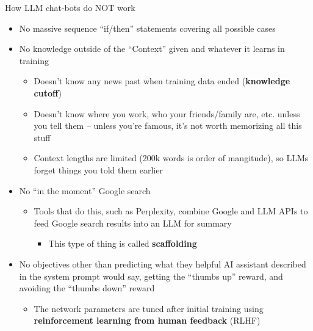 \documentclass[xcolor=table, aspectratio=169]{beamer}
\newcommand{\alertbf}[1]{\alert{\textbf{#1}}}
\begin{document}
\begin{frame}{How LLM chat-bots do NOT work}

\begin{itemize}
    \item No massive sequence ``if/then'' statements covering all possible cases
    \item No knowledge outside of the ``Context'' given and whatever it learns in training
    \begin{itemize}
        \item Doesn't know any news past when training data ended (\alertbf{knowledge cutoff})
        \item Doesn't know where you work, who your friends/family are, etc. unless you tell them -- unless you're famous, it's not worth memorizing all this stuff
        \item Context lengths are limited (200k words is order of mangitude), so LLMs forget things you told them earlier
    \end{itemize}
    \item No ``in the moment'' Google search
    \begin{itemize}
        \item Tools that do this, such as Perplexity, combine Google and LLM APIs to feed Google search results into an LLM for summary
        \begin{itemize}
            \item This type of thing is called \alertbf{scaffolding}
        \end{itemize}
    \end{itemize}
    \item No objectives other than predicting what they helpful AI assistant described in the system prompt would say, getting the ``thumbs up'' reward, and avoiding the ``thumbs down'' reward
    \begin{itemize}
        \item The network parameters are tuned after initial training using \alertbf{reinforcement learning from human feedback} (RLHF)
    \end{itemize}
\end{itemize}
\end{frame}
\end{document}
